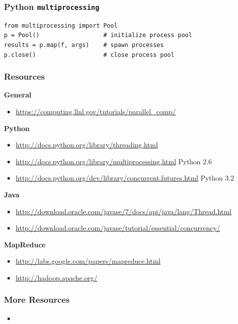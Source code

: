 \documentclass[t]{beamer}
\begin{document}
\begin{frame}[fragile]
\frametitle{Python \texttt{multiprocessing}}
\begin{verbatim}
from multiprocessing import Pool
p = Pool()                  # initialize process pool
results = p.map(f, args)    # spawn processes
p.close()                   # close process pool 
\end{verbatim}
\end{frame}

\begin{frame}
\frametitle{Resources}
\textbf{General}
\begin{itemize}
  \item \url{https://computing.llnl.gov/tutorials/parallel_comp/}
\end{itemize}

\textbf{Python}
\begin{itemize}
  \item \url{http://docs.python.org/library/threading.html}
  \item \url{http://docs.python.org/library/multiprocessing.html} \tiny{Python 2.6}
  \item \url{http://docs.python.org/dev/library/concurrent.futures.html} \tiny{Python 3.2}
\end{itemize}

\textbf{Java}
\begin{itemize}
  \item \url{http://download.oracle.com/javase/7/docs/api/java/lang/Thread.html}
  \item \url{http://download.oracle.com/javase/tutorial/essential/concurrency/}
\end{itemize}

\textbf{MapReduce}
\begin{itemize}
  \item \url{http://labs.google.com/papers/mapreduce.html}
  \item \url{http://hadoop.apache.org/}
\end{itemize}
\end{frame}

\begin{frame}
\frametitle{More Resources}
\begin{itemize}
  \item
\end{itemize}
\end{frame}

\frame{\tableofcontents}

\frame{\titlepage}
\end{document}
